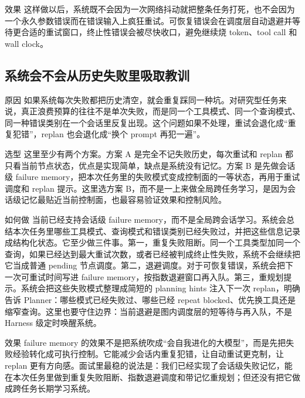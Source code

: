\documentclass[12pt]{article}
\begin{document}
\begin{qaBox}{效果}
这样做以后，系统既不会因为一次网络抖动就把整条任务打死，也不会因为一个永久参数错误而在错误输入上疯狂重试。可恢复错误会在调度层自动退避并等待更合适的重试窗口，终止性错误会被尽快收口，避免继续烧 token、tool call 和 wall clock。
\end{qaBox}

\subsection{系统会不会从历史失败里吸取教训}
\begin{qaBox}{原因}
如果系统每次失败都把历史清空，就会重复踩同一种坑。对研究型任务来说，真正浪费预算的往往不是单次失败，而是同一个工具模式、同一个查询模式、同一种错误类别在一个会话里反复出现。这个问题如果不处理，重试会退化成“重复犯错”，replan 也会退化成“换个 prompt 再犯一遍”。
\end{qaBox}

\begin{qaBox}{选型}
这里至少有两个方案。方案 A 是完全不记失败历史，每次重试和 replan 都只看当前节点状态，优点是实现简单，缺点是系统没有记忆。方案 B 是先做会话级 failure memory，把本次任务里的失败模式变成控制面的一等状态，再用于重试调度和 replan 提示。这里选方案 B，而不是一上来做全局跨任务学习，是因为会话级记忆最贴近当前控制面，也最容易验证效果和控制风险。
\end{qaBox}

\begin{qaBox}{如何做}
当前已经支持会话级 failure memory，而不是全局跨会话学习。系统会总结本次任务里哪些工具模式、查询模式和错误类别已经失败过，并把这些信息记录成结构化状态。它至少做三件事。第一，重复失败阻断。同一个工具类型加同一个查询，如果已经达到最大重试次数，或者已经被判成终止性失败，系统不会继续把它当成普通 pending 节点调度。第二，退避调度。对于可恢复错误，系统会把下一次可重试时间写进 failure memory，按指数退避窗口再入队。第三，重规划提示。系统会把这些失败模式整理成简短的 planning hints 注入下一次 replan，明确告诉 Planner：哪些模式已经失败过、哪些已经 repeat blocked、优先换工具还是缩窄查询。这里也要守住边界：当前退避是图内调度层的短等待与再入队，不是 Harness 级定时唤醒系统。
\end{qaBox}

\begin{qaBox}{效果}
failure memory 的效果不是把系统吹成“会自我进化的大模型”，而是先把失败经验转化成可执行控制。它能减少会话内重复犯错，让自动重试更克制，让 replan 更有方向感。面试里最稳的说法是：我们已经实现了会话级失败记忆，能在本次任务里做到重复失败阻断、指数退避调度和带记忆重规划；但还没有把它做成跨任务长期学习系统。
\end{qaBox}
\end{document}
